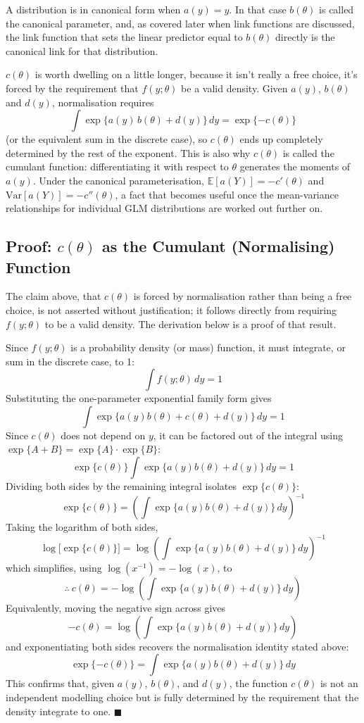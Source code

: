 \documentclass[12pt,a4paper]{report}
\begin{document}
A distribution is in canonical form when $a(y) = y$. In that case $b(\theta)$ is called the canonical parameter, and, as covered later when link functions are discussed, the link function that sets the linear predictor equal to $b(\theta)$ directly is the canonical link for that distribution.

$c(\theta)$ is worth dwelling on a little longer, because it isn't really a free choice, it's forced by the requirement that $f(y;\theta)$ be a valid density. Given $a(y)$, $b(\theta)$ and $d(y)$, normalisation requires
\[
\int \exp\{a(y)\,b(\theta) + d(y)\}\,dy = \exp\{-c(\theta)\}
\]
(or the equivalent sum in the discrete case), so $c(\theta)$ ends up completely determined by the rest of the exponent. This is also why $c(\theta)$ is called the cumulant function: differentiating it with respect to $\theta$ generates the moments of $a(y)$. Under the canonical parameterisation, $\mathbb{E}[a(Y)] = -c'(\theta)$ and $\mathrm{Var}[a(Y)] = -c''(\theta)$, a fact that becomes useful once the mean-variance relationships for individual GLM distributions are worked out further on.

\subsection*{Proof: $c(\theta)$ as the Cumulant (Normalising) Function}

The claim above, that $c(\theta)$ is forced by normalisation rather than being a free choice, is not asserted without justification; it follows directly from requiring $f(y;\theta)$ to be a valid density. The derivation below is a proof of that result.

Since $f(y;\theta)$ is a probability density (or mass) function, it must integrate, or sum in the discrete case, to 1:
\[
\int f(y;\theta)\, dy = 1
\]
Substituting the one-parameter exponential family form gives
\[
\int \exp\{a(y)b(\theta) + c(\theta) + d(y)\}\, dy = 1
\]
Since $c(\theta)$ does not depend on $y$, it can be factored out of the integral using $\exp\{A+B\} = \exp\{A\}\cdot\exp\{B\}$:
\[
\exp\{c(\theta)\} \int \exp\{a(y)b(\theta) + d(y)\}\, dy = 1
\]
Dividing both sides by the remaining integral isolates $\exp\{c(\theta)\}$:
\[
\exp\{c(\theta)\} = \left( \int \exp\{a(y)b(\theta) + d(y)\}\, dy \right)^{-1}
\]
Taking the logarithm of both sides,
\[
\log\big[\exp\{c(\theta)\}\big] = \log\left( \int \exp\{a(y)b(\theta) + d(y)\}\, dy \right)^{-1}
\]
which simplifies, using $\log(x^{-1}) = -\log(x)$, to
\[
\therefore\ c(\theta) = -\log\left( \int \exp\{a(y)b(\theta) + d(y)\}\, dy \right)
\]
Equivalently, moving the negative sign across gives
\[
-c(\theta) = \log\left( \int \exp\{a(y)b(\theta) + d(y)\}\, dy \right)
\]
and exponentiating both sides recovers the normalisation identity stated above:
\[
\exp\{-c(\theta)\} = \int \exp\{a(y)b(\theta) + d(y)\}\, dy
\]
This confirms that, given $a(y)$, $b(\theta)$, and $d(y)$, the function $c(\theta)$ is not an independent modelling choice but is fully determined by the requirement that the density integrate to one. $\blacksquare$
\end{document}
